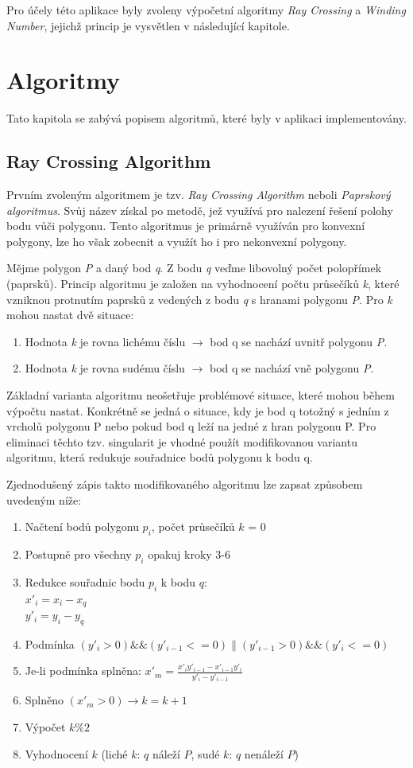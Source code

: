 \documentclass[a4paper, 12pt]{article}
\begin{document}
Pro účely této aplikace byly zvoleny výpočetní algoritmy \textit{Ray Crossing} a \textit{Winding Number}, jejichž princip je vysvětlen v následující kapitole.

\section{Algoritmy}
Tato kapitola se zabývá popisem algoritmů, které byly v aplikaci implementovány. 

\subsection{Ray Crossing Algorithm}
Prvním zvoleným algoritmem je tzv. \textit{Ray Crossing Algorithm} neboli \textit{Paprskový algoritmus}. Svůj název získal po metodě, jež využívá pro nalezení řešení polohy bodu vůči polygonu. Tento algoritmus je primárně využíván pro konvexní polygony, lze ho však zobecnit a využít ho i pro nekonvexní polygony. 

Mějme polygon \textit{P} a daný bod \textit{q}. Z bodu \textit{q} veďme libovolný počet polopřímek (paprsků). Princip algoritmu je založen na vyhodnocení počtu průsečíků \textit{k}, které vzniknou protnutím paprsků z vedených z bodu \textit{q} s hranami polygonu \textit{P}. Pro \textit{k} mohou nastat dvě situace:
\begin{enumerate}
\item Hodnota \textit{k} je rovna lichému číslu $\rightarrow$ bod q se nachází uvnitř polygonu  \textit{P}.
\item Hodnota \textit{k} je rovna sudému číslu $\rightarrow$ bod q se nachází vně polygonu \textit{P}.
\end{enumerate}

Základní varianta algoritmu neošetřuje problémové situace, které mohou během výpočtu nastat. Konkrétně se jedná o situace, kdy je bod q totožný s jedním z vrcholů polygonu P nebo pokud bod q leží na jedné z hran polygonu P. Pro eliminaci těchto tzv. singularit je vhodné použít modifikovanou variantu algoritmu, která redukuje souřadnice bodů polygonu k bodu q. 

Zjednodušený zápis takto modifikovaného algoritmu lze zapsat způsobem uvedeným níže:
\begin{enumerate}
\item Načtení bodů polygonu $p_i$, počet průsečíků $k$ = 0
\item Postupně pro všechny $p_i$ opakuj kroky 3-6
\item 	Redukce souřadnic bodu $p_i$ k bodu $q$:\\
$x'_i = x_i - x_q$\\
$y'_i = y_i - y_q$
\item 	Podmínka $(y'_i > 0)\&\&(y'_{i-1} <= 0)\|(y'_{i-1} > 0)\&\&(y'_{i} <= 0)$
\item 	Je-li podmínka splněna: $x'_m = \frac{x'_i y'_{i-1} - x'_{i-1} y'_i}{y'_i - y'_{i-1}}$
\item Splněno $(x'_m > 0) \rightarrow k = k + 1$ 
\item Výpočet $k\%2$
\item Vyhodnocení $k$ (liché $k$: $q$ náleží $P$, sudé $k$: $q$ nenáleží $P$)
\end{enumerate}
\end{document}
